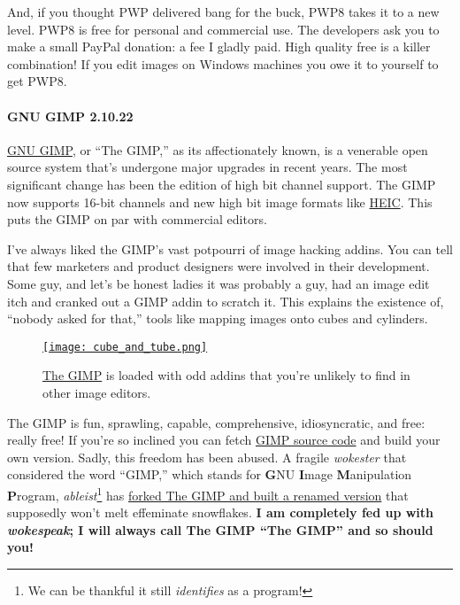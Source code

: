 And, if you thought PWP delivered bang for the buck, PWP8 takes it to a
new level. PWP8 is free for personal and commercial use. The developers
ask you to make a small PayPal donation: a fee I gladly paid. High
quality free is a killer combination! If you edit images on Windows
machines you owe it to yourself to get PWP8.

\paragraph{GNU GIMP 2.10.22}\label{gnu-gimp-2.10.22}

\href{https://www.gimp.org/}{GNU GIMP}, or ``The GIMP,'' as its
affectionately known, is a venerable open source system that's undergone
major upgrades in recent years. The most significant change has been the
edition of high bit channel support. The GIMP now supports 16-bit
channels and new high bit image formats like
\href{https://www.macworld.co.uk/feature/what-is-heic-3660408/}{HEIC}.
This puts the GIMP on par with commercial editors.

I've always liked the GIMP's vast potpourri of image hacking addins. You
can tell that few marketers and product designers were involved in their
development. Some guy, and let's be honest ladies it was probably a guy,
had an image edit itch and cranked out a GIMP addin to scratch it. This
explains the existence of, ``nobody asked for that,'' tools like mapping
images onto cubes and cylinders.



\captionsetup[figure]{labelformat=empty}
\begin{SCfigure}
\centering
\href{https://conceptcontrol.smugmug.com/Themes/Manipulations/Alpha-Layered/i-HjsC9Lp/A}{\texttt{[image: cube\_and\_tube.png]}}
\caption{\href{https://www.gimp.org/}{The GIMP} is loaded with odd addins that
you're unlikely to find in other image editors.}
\label{fig:7048X5}
\end{SCfigure}

The GIMP is fun, sprawling, capable, comprehensive, idiosyncratic, and
free: really free! If you're so inclined you can fetch
\href{https://gitlab.gnome.org/GNOME/gimp}{GIMP source code} and build
your own version. Sadly, this freedom has been abused. A fragile
\emph{wokester} that considered the word ``GIMP,'' which stands for
\textbf{G}NU \textbf{I}mage \textbf{M}anipulation \textbf{P}rogram,
\emph{ableist}\footnote{We can be thankful it still \emph{identifies} as a
  program!} has
\href{https://thenextweb.com/dd/2019/08/28/developer-forks-gimp-image-editor-over-naughty-name/}{forked
The GIMP and built a renamed version} that supposedly won't melt
effeminate snowflakes. \textbf{I am completely fed up with
\emph{wokespeak}; I will always call The GIMP ``The GIMP'' and so should
you!}


